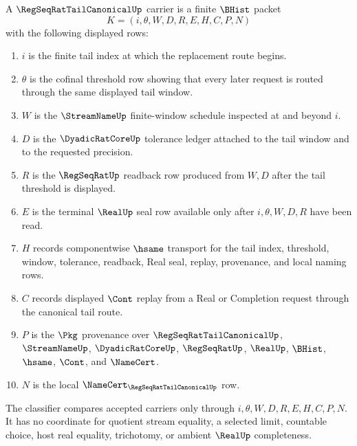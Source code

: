 \begin{definition}
\label{def:regseqrat-tail-canonical-carrier}
A $\RegSeqRatTailCanonicalUp$ carrier is a finite $\BHist$ packet
$$
K=(i,\theta,W,D,R,E,H,C,P,N)
$$
with the following displayed rows:
\begin{enumerate}
\item $i$ is the finite tail index at which the replacement route begins.
\item $\theta$ is the cofinal threshold row showing that every later request is routed through the same displayed tail window.
\item $W$ is the $\StreamNameUp$ finite-window schedule inspected at and beyond $i$.
\item $D$ is the $\DyadicRatCoreUp$ tolerance ledger attached to the tail window and to the requested precision.
\item $R$ is the $\RegSeqRatUp$ readback row produced from $W,D$ after the tail threshold is displayed.
\item $E$ is the terminal $\RealUp$ seal row available only after $i,\theta,W,D,R$ have been read.
\item $H$ records componentwise $\hsame$ transport for the tail index, threshold, window, tolerance, readback, Real seal, replay, provenance, and local naming rows.
\item $C$ records displayed $\Cont$ replay from a Real or Completion request through the canonical tail route.
\item $P$ is the $\Pkg$ provenance over $\RegSeqRatTailCanonicalUp$, $\StreamNameUp$, $\DyadicRatCoreUp$, $\RegSeqRatUp$, $\RealUp$, $\BHist$, $\hsame$, $\Cont$, and $\NameCert$.
\item $N$ is the local $\NameCert_{\RegSeqRatTailCanonicalUp}$ row.
\end{enumerate}
The classifier compares accepted carriers only through $i,\theta,W,D,R,E,H,C,P,N$. It has no coordinate for quotient stream equality, a selected limit, countable choice, host real equality, trichotomy, or ambient $\RealUp$ completeness.
\end{definition}

